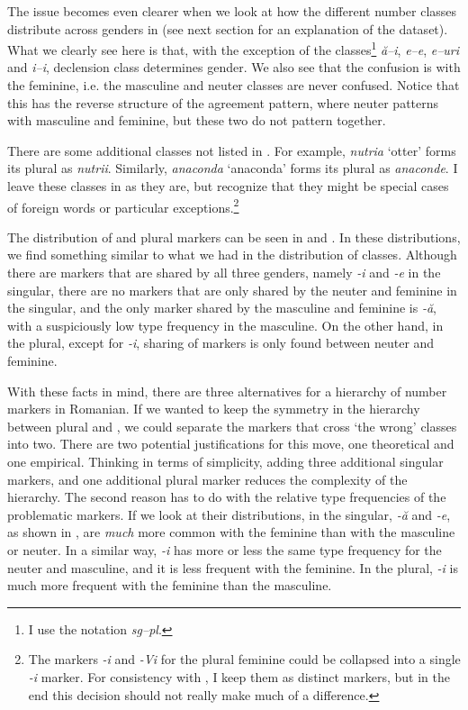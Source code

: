 The issue becomes even clearer when we look at how the different number classes distribute across genders in  (see next section for an explanation of the dataset). What we clearly see here is that, with the exception of the classes\footnote{I use the notation \textit{sg--pl}.} \textit{ă--i}, \textit{e--e}, \textit{e--uri} and \textit{i--i}, declension class determines gender. We also see that the confusion is with the feminine, i.e. the masculine and neuter classes are never confused. Notice that this has the reverse structure of the agreement pattern, where neuter patterns with masculine and feminine, but these two do not pattern together.

\largerpage[2]
There are some additional classes not listed in \textcite{Cojocaru.2003}. For example, \textit{nutria} `otter' forms its plural as \textit{nutrii}. Similarly, \textit{anaconda} `anaconda' forms its plural as \textit{anaconde}. I leave these classes in as they are, but recognize that they might be special cases of foreign words or particular exceptions.\footnote{The markers \textit{-i} and \textit{-Vi} for the plural feminine could be collapsed into a single \textit{-i} marker. For consistency with \textcite{Cojocaru.2003}, I keep them as distinct markers, but in the end this decision should not really make much of a difference.}

The distribution of  and plural markers can be seen in  and . In these distributions, we find something similar to what we had in the distribution of classes. Although there are markers that are shared by all three genders, namely \textit{-i} and \textit{-e} in the singular, there are no markers that are only shared by the neuter and feminine in the singular, and the only marker shared by the masculine and feminine is \textit{-ă}, with a suspiciously low type frequency in the masculine. On the other hand, in the plural, except for \textit{-i}, sharing of markers is only found between neuter and feminine.

With these facts in mind, there are three alternatives for a hierarchy of number markers in Romanian. If we wanted to keep the symmetry in the hierarchy between plural and , we could separate the markers that cross `the wrong' classes into two. There are two potential justifications for this move, one theoretical and one empirical. Thinking in terms of simplicity, adding three additional singular markers, and one additional plural marker reduces the complexity of the hierarchy. The second reason has to do with the relative type frequencies of the problematic markers. If we look at their distributions, in the singular, \textit{-ă} and \textit{-e}, as shown in , are \textit{much} more common with the feminine than with the masculine or neuter. In a similar way, \textit{-i} has more or less the same type frequency for the neuter and masculine, and it is less frequent with the feminine. In the plural, \textit{-i} is much more frequent with the feminine than the masculine.

